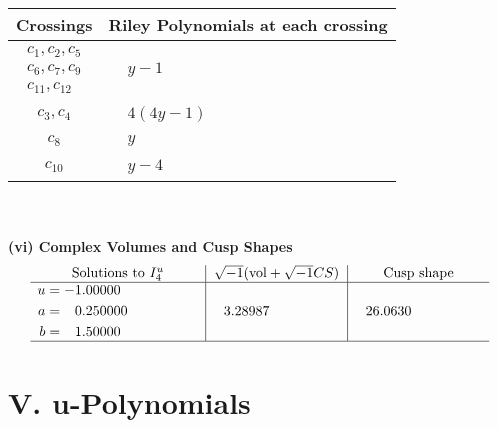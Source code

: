 \documentclass[1p]{elsarticle_modified}
\theoremstyle{definition}
\newcommand{\I}{\sqrt{-1}}
\begin{document}
\begin{tabular}{m{50pt}|m{274pt}}
Crossings & \hspace{64pt}Riley Polynomials at each crossing \\
\hline $$\begin{aligned}c_{1},c_{2},c_{5}\\c_{6},c_{7},c_{9}\\c_{11},c_{12}\end{aligned}$$&$\begin{aligned}
&y-1
\end{aligned}$\\
\hline $$\begin{aligned}c_{3},c_{4}\end{aligned}$$&$\begin{aligned}
&4(4 y-1)
\end{aligned}$\\
\hline $$\begin{aligned}c_{8}\end{aligned}$$&$\begin{aligned}
&y
\end{aligned}$\\
\hline $$\begin{aligned}c_{10}\end{aligned}$$&$\begin{aligned}
&y-4
\end{aligned}$\\
\hline
\end{tabular}\\~\\
\newpage\flushleft \textbf{(vi) Complex Volumes and Cusp Shapes}
$$\begin{array}{c|c|c}  
\text{Solutions to }I^u_{4}& \I (\text{vol} + \sqrt{-1}CS) & \text{Cusp shape}\\
 \hline 
\begin{aligned}
u &= -1.00000\phantom{ +0.000000I} \\
a &= \phantom{-}0.250000\phantom{ +0.000000I} \\
b &= \phantom{-}1.50000\phantom{ +0.000000I}\end{aligned}
 & \phantom{-}3.28987\phantom{ +0.000000I} & \phantom{-}26.0630\phantom{ +0.000000I}\\
 \hline 
 \end{array}$$\newpage
\newpage\renewcommand{\arraystretch}{1}
\centering \section*{ V. u-Polynomials}
\end{document}
